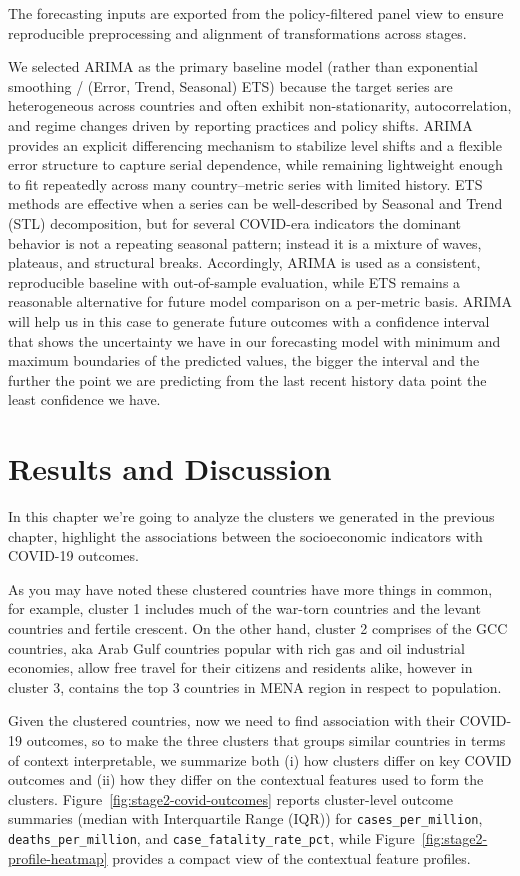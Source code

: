 \documentclass[a4paper]{report}
\begin{document}
The forecasting inputs are exported from the policy-filtered panel view to ensure reproducible preprocessing and alignment of transformations across stages.

We selected ARIMA as the primary baseline model (rather than exponential smoothing / (Error, Trend, Seasonal) ETS) because the target series are heterogeneous across countries and often exhibit non-stationarity, autocorrelation, and regime changes driven by reporting practices and policy shifts.
ARIMA provides an explicit differencing mechanism to stabilize level shifts and a flexible error structure to capture serial dependence, while remaining lightweight enough to fit repeatedly across many country--metric series with limited history.
ETS methods are effective when a series can be well-described by Seasonal and Trend (STL) decomposition, but for several COVID-era indicators the dominant behavior is not a repeating seasonal pattern; instead it is a mixture of waves, plateaus, and structural breaks.
Accordingly, ARIMA is used as a consistent, reproducible baseline with out-of-sample evaluation, while ETS remains a reasonable alternative for future model comparison on a per-metric basis. ARIMA will help us in this case to generate future outcomes with a confidence interval that shows the uncertainty we have in our forecasting model with minimum and maximum boundaries of the predicted values, the bigger the interval and the further the point we are predicting from the last recent history data point the least confidence we have.


\chapter{Results and Discussion}\label{ch5:results}
In this chapter we're going to analyze the clusters we generated in the previous chapter, highlight the associations between the socioeconomic indicators with COVID-19 outcomes.

As you may have noted these clustered countries have more things in common, for example, cluster 1 includes much of the war-torn countries and
the levant countries and fertile crescent. On the other hand, cluster 2 comprises of the GCC countries, aka Arab Gulf countries popular with rich gas and oil industrial economies, allow free travel for their citizens and residents alike, however in cluster 3, contains the top 3 countries in MENA region in respect to population.

Given the clustered countries, now we need to find association with their COVID-19 outcomes, so to make the three clusters that groups similar countries in terms of context interpretable, we summarize both (i) how clusters differ on key COVID outcomes and (ii) how they differ on the contextual features used to form the clusters.
Figure~\ref{fig:stage2-covid-outcomes} reports cluster-level outcome summaries (median with Interquartile Range (IQR)) for \texttt{cases\_per\_million}, \texttt{deaths\_per\_million}, and \texttt{case\_fatality\_rate\_pct}, while Figure~\ref{fig:stage2-profile-heatmap} provides a compact view of the contextual feature profiles.
\end{document}
